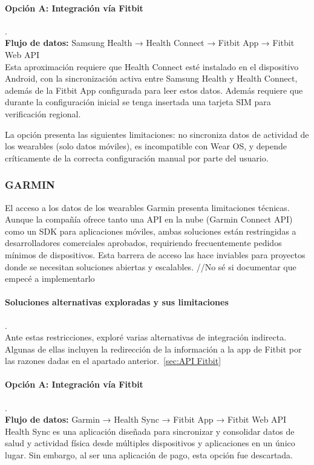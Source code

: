 \paragraph{Opción A: Integración vía Fitbit} . \\
\textbf{Flujo de datos: } Samsung Health → Health Connect → Fitbit App → Fitbit Web API \\
 Esta aproximación requiere que Health Connect esté instalado en el dispositivo Android, con la sincronización activa entre Samsung Health y Health Connect, además de la Fitbit App configurada para leer estos datos. Además requiere que durante la configuración inicial se tenga insertada una tarjeta SIM para verificación regional.

 La opción presenta las siguientes limitaciones: no sincroniza datos de actividad de los wearables (solo datos móviles), es incompatible con Wear OS, y depende críticamente de la correcta configuración manual por parte del usuario. 

\subsubsection{GARMIN}


El acceso a los datos de los wearables Garmin presenta  limitaciones técnicas. Aunque la compañía ofrece tanto una API en la nube (Garmin Connect API) como un SDK para aplicaciones móviles, ambas soluciones están restringidas a desarrolladores comerciales aprobados, requiriendo frecuentemente pedidos mínimos de dispositivos. Esta barrera de acceso las hace inviables para proyectos donde se necesitan soluciones abiertas y escalables.
//No sé si documentar que empecé a implementarlo 


\paragraph{Soluciones alternativas exploradas y sus limitaciones} . \\
Ante estas restricciones, exploré varias alternativas de integración indirecta. Algunas de ellas incluyen la redirección de la información a la app de Fitbit por las razones dadas en el apartado anterior.~\ref{sec:API Fitbit}


\paragraph{Opción A: Integración vía Fitbit} . \\
\textbf{Flujo de datos: } Garmin → Health Sync → Fitbit App → Fitbit Web API \\
Health Sync es una aplicación diseñada para sincronizar y consolidar datos de salud y actividad física desde múltiples dispositivos y aplicaciones en un único lugar. Sin embargo, al ser una aplicación de pago, esta opción fue descartada.



